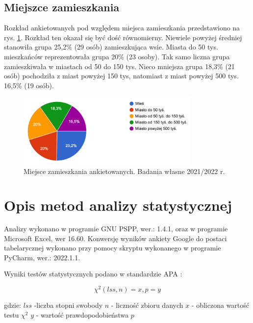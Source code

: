 \documentclass[a4paper,12pt,twoside,openright]{mwrep}
\begin{document}
\subsection*{Miejszce zamieszkania}
Rozkład ankietowanych pod względem miejsca zamieszkania przedstawiono na rys. \ref{rys:zamiesz}. Rozkład ten okazał się być dość równomierny. Niewiele powyżej średniej stanowiła grupa 25,2\%   (29 osób) zamieszkująca  wsie. Miasta do 50 tys. mieszkańców reprezentowała grupa  20\%  (23 osoby). Tak samo liczna grupa zamieszkiwała w miastach od 50 do 150 tys. Nieco mniejsza grupa  18,3\% (21 osób) pochodziła z miast powyżej 150 tys, natomiast z miast powyżej 500 tys.  16,5\% (19 osób).
\begin{figure}[H]
\centering
\includegraphics[width=9cm]{char_gr_bad/zamieszka00}
\caption{Miejsce zamieszkania ankietowanych. Badania własne 2021/2022 r.}
\label{rys:zamiesz}
\end{figure}

\section{Opis metod analizy statystycznej}

Analizy wykonano w programie GNU PSPP, wer.: 1.4.1, oraz w programie Microsoft Excel, wer 16.60. Konwersję wyników ankiety Google do postaci tabelarycznej wykonano przy pomocy skryptu wykonanego w programie PyCharm, wer.: 2022.1.1.

\vspace{\baselineskip} 

Wyniki testów statystycznych podano w standardzie APA \cite{apa}:\newline

\begin{equation}
    \chi^2 (lss, n) = x, p=y
\end{equation}

\vspace{\baselineskip} 
gdzie:\newline
$lss$ -liczba stopni swobody\newline
$n$ - liczność zbioru danych\newline
$x$ - obliczona wartość testu $\chi^2$\newline
$y$ - wartość prawdopodobieństwa $p$\newline
\end{document}
